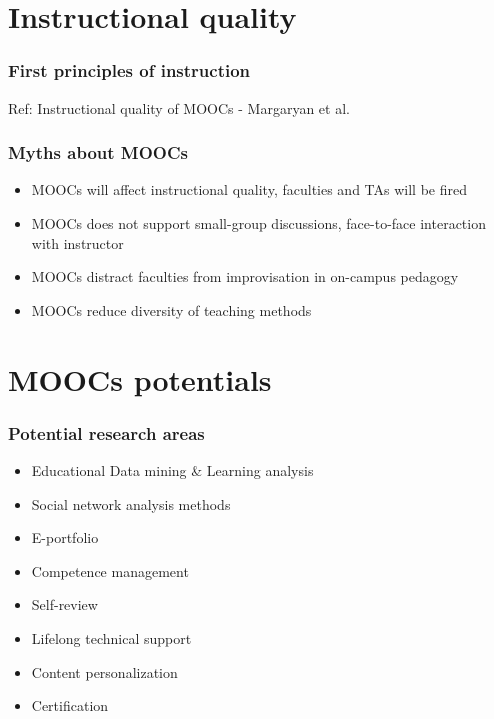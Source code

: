 \documentclass[13pt]{beamer}
\begin{document}
\section{Instructional quality}
\begin{frame}
	\frametitle{First principles of instruction}
		\begin{figure}[ht]
	    \begin{center}
	    \end{center}
	\end{figure}
	Ref: Instructional quality of MOOCs - Margaryan et al.
\end{frame}

\begin{frame}
	\frametitle{Myths about MOOCs}
	\begin{itemize}
	  \item MOOCs will affect instructional quality, faculties and TAs will be fired
	  \item MOOCs does not support small-group discussions, face-to-face interaction with instructor
	  \item MOOCs distract faculties from improvisation in on-campus pedagogy
	  \item MOOCs reduce diversity of teaching methods
	\end{itemize}
\end{frame}

\section{MOOCs potentials}
\begin{frame}
	\frametitle{Potential research areas}
	\begin{itemize}
	  \item Educational Data mining \& Learning analysis
	  \item Social network analysis methods
	  \item E-portfolio
	  \item Competence management
	  \item Self-review
	  \item Lifelong technical support
	  \item Content personalization
	  \item Certification
	\end{itemize}
\end{frame}
\end{document}
